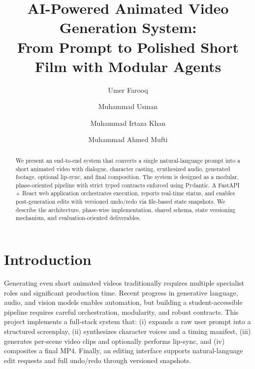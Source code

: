 \documentclass[runningheads]{llncs}
\begin{document}
\title{AI-Powered Animated Video Generation System:\\From Prompt to Polished Short Film with Modular Agents}


\author{
Umer Farooq \and
Muhammad Usman \and
Muhammad Irtaza Khan \and
Muhammad Ahmed Mufti
}



\maketitle

\begin{abstract}
We present an end-to-end system that converts a single natural-language prompt into a short animated video with dialogue, character casting, synthesized audio, generated footage, optional lip-sync, and final composition. The system is designed as a modular, phase-oriented pipeline with strict typed contracts enforced using Pydantic. A FastAPI + React web application orchestrates execution, reports real-time status, and enables post-generation edits with versioned undo/redo via file-based state snapshots. We describe the architecture, phase-wise implementation, shared schema, state versioning mechanism, and evaluation-oriented deliverables.
\end{abstract}

\section{Introduction}
Generating even short animated videos traditionally requires multiple specialist roles and significant production time. Recent progress in generative language, audio, and vision models enables automation, but building a student-accessible pipeline requires careful orchestration, modularity, and robust contracts. This project implements a full-stack system that:
(i) expands a raw user prompt into a structured screenplay, (ii) synthesizes character voices and a timing manifest, (iii) generates per-scene video clips and optionally performs lip-sync, and (iv) composites a final MP4. Finally, an editing interface supports natural-language edit requests and full undo/redo through versioned snapshots.
\end{document}
